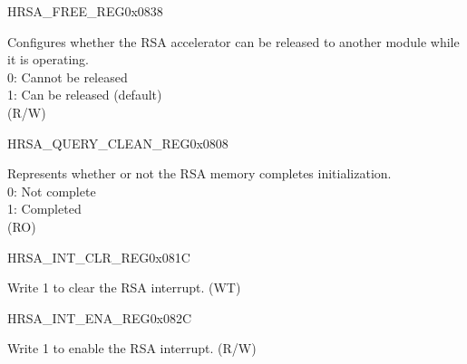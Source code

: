 \begin{register}{H}{RSA\_FREE\_REG}{0x0838}\label{regdesc:RSAFREEREG}
%
%
\regnewline%
\begin{regdesc}\begin{reglist}
\label{fielddesc:RSAFREE}\item [RSA\_FREE] Configures whether the RSA accelerator can be released to another module while it is operating.\\
0: Cannot be released\\
1: Can be released (default)\\
 (R/W)
\end{reglist}\end{regdesc}
\end{register}

\begin{register}{H}{RSA\_QUERY\_CLEAN\_REG}{0x0808}\label{regdesc:RSAQUERYCLEANREG}
%
%
\regnewline%
\begin{regdesc}\begin{reglist}
\label{fielddesc:RSAQUERYCLEAN}\item [RSA\_QUERY\_CLEAN] Represents whether or not the RSA memory completes initialization.\\
0: Not complete\\
1: Completed\\
 (RO)
\end{reglist}\end{regdesc}
\end{register}


\begin{register}{H}{RSA\_INT\_CLR\_REG}{0x081C}\label{regdesc:RSAINTCLRREG}
%
%
\regnewline%
\begin{regdesc}\begin{reglist}
\label{fielddesc:RSACLEARINTERRUPT}\item [RSA\_CLEAR\_INTERRUPT] Write 1 to clear the RSA interrupt. (WT)
\end{reglist}\end{regdesc}
\end{register}


\begin{register}{H}{RSA\_INT\_ENA\_REG}{0x082C}\label{regdesc:RSAINTENAREG}
%
%
\regnewline%
\begin{regdesc}\begin{reglist}
\label{fielddesc:RSAINTENA}\item [RSA\_INT\_ENA] Write 1 to enable the RSA interrupt. (R/W)
\end{reglist}\end{regdesc}
\end{register}


